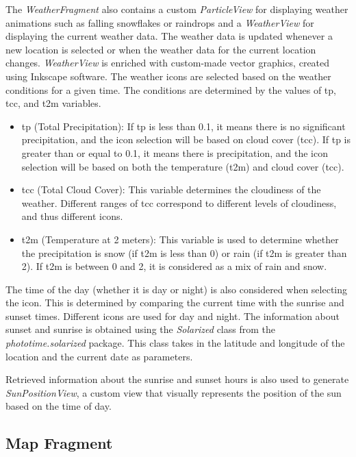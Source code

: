 

The \textit{WeatherFragment} also contains a custom \textit{ParticleView} for displaying weather animations such as falling snowflakes or raindrops and a \textit{WeatherView} for displaying the current weather data. The weather data is updated whenever a new location is selected or when the weather data for the current location changes. \textit{WeatherView} is enriched with custom-made vector graphics, created using Inkscape software. The weather icons are selected based on the weather conditions for a given time. The conditions are determined by the values of tp, tcc, and t2m variables. 

\begin{itemize}
    \item tp (Total Precipitation): If tp is less than 0.1, it means there is no significant precipitation, and the icon selection will be based on cloud cover (tcc). If tp is greater than or equal to 0.1, it means there is precipitation, and the icon selection will be based on both the temperature (t2m) and cloud cover (tcc).
    \item tcc (Total Cloud Cover): This variable determines the cloudiness of the weather. Different ranges of tcc correspond to different levels of cloudiness, and thus different icons.
    \item t2m (Temperature at 2 meters): This variable is used to determine whether the precipitation is snow (if t2m is less than 0) or rain (if t2m is greater than 2). If t2m is between 0 and 2, it is considered as a mix of rain and snow.
\end{itemize}

The time of the day (whether it is day or night) is also considered when selecting the icon. This is determined by comparing the current time with the sunrise and sunset times. Different icons are used for day and night. The information about sunset and sunrise is obtained using the \textit{Solarized} class from the \textit{phototime.solarized} \cite{solarized-android} package. This class takes in the latitude and longitude of the location and the current date as parameters.



Retrieved information about the sunrise and sunset hours is also used to generate \textit{SunPositionView}, a custom view that visually represents the position of the sun based on the time of day.

\subsection{Map Fragment}

